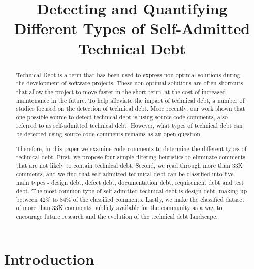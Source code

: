 \documentclass[conference]{IEEEtran}
\begin{document}
\title{Detecting and Quantifying Different Types of Self-Admitted Technical Debt}

\author{

}

\maketitle

\begin{abstract} Technical Debt is a term that has been used to express non-optimal solutions during the development of software projects. These non optimal solutions are often shortcuts that allow the project to move faster in the short term, at the cost of increased maintenance in the future. To help alleviate the impact of technical debt, a number of studies focused on the detection of technical debt. More recently, our work shown that one possible source to detect technical debt is using source code comments, also referred to as self-admitted technical debt. However, what types of technical debt can be detected using source code comments remains as an open question.
	
Therefore, in this paper we examine code comments to determine the different types of technical debt. First, we propose four simple filtering heuristics to eliminate comments that are not likely to contain technical debt. Second, we read through more than 33K comments, and we find that self-admitted technical debt can be classified into five main types - design debt, defect debt, documentation debt, requirement debt and test debt. The  most common type of self-admitted technical debt is design debt, making up between 42\% to 84\% of the classified comments. Lastly, we make the classified dataset of more than 33K comments publicly available for the community as a way to encourage future research and the evolution of the technical debt landscape.	
\end{abstract}

\IEEEpeerreviewmaketitle

\section{Introduction}
\label{sec:introduction}

\end{document}
